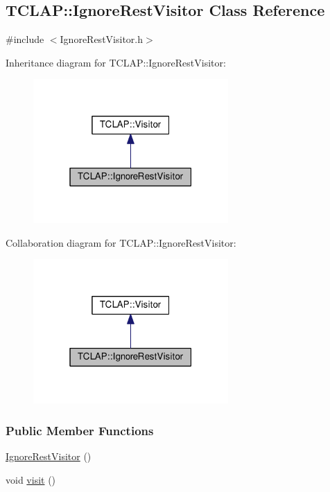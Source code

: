\hypertarget{classTCLAP_1_1IgnoreRestVisitor}{}\subsection{T\+C\+L\+AP\+:\+:Ignore\+Rest\+Visitor Class Reference}
\label{classTCLAP_1_1IgnoreRestVisitor}


{\ttfamily \#include $<$Ignore\+Rest\+Visitor.\+h$>$}



Inheritance diagram for T\+C\+L\+AP\+:\+:Ignore\+Rest\+Visitor\+:
\nopagebreak
\begin{figure}[H]
\begin{center}
\leavevmode
\includegraphics[width=211pt]{classTCLAP_1_1IgnoreRestVisitor__inherit__graph}
\end{center}
\end{figure}


Collaboration diagram for T\+C\+L\+AP\+:\+:Ignore\+Rest\+Visitor\+:
\nopagebreak
\begin{figure}[H]
\begin{center}
\leavevmode
\includegraphics[width=211pt]{classTCLAP_1_1IgnoreRestVisitor__coll__graph}
\end{center}
\end{figure}
\subsubsection*{Public Member Functions}
\begin{DoxyCompactItemize}
\item 
\hyperlink{classTCLAP_1_1IgnoreRestVisitor_a4cd949b7aeff99fba4a8494e02a1cb01}{Ignore\+Rest\+Visitor} ()
\item 
void \hyperlink{classTCLAP_1_1IgnoreRestVisitor_ac2a054ed72b16608a32021c65a600722}{visit} ()
\end{DoxyCompactItemize}


